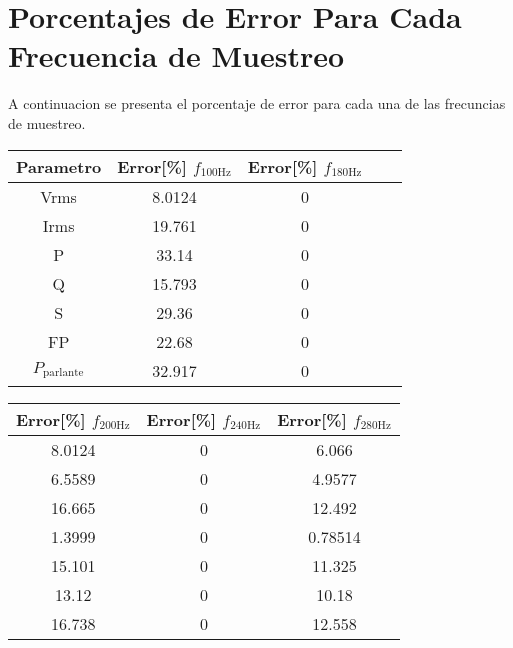 
\section{Porcentajes de Error Para Cada Frecuencia de Muestreo}
A continuacion se presenta el porcentaje de error para cada una de las frecuncias de muestreo.

    \begin{tabular}{ccccc}
        \toprule
        \textbf{Parametro} & \textbf{Error[\%] $f_{\text{100Hz}}$} & \textbf{Error[\%] $f_{\text{180Hz}}$}\\
        \midrule
        Vrms                  & 8.0124   & 0  \\                     
        Irms                  & 19.761  & 0  \\
        P                     & 33.14      & 0  \\
        Q                     & 15.793 & 0 \\
        S                     & 29.36  & 0 \\
        FP                    & 22.68  & 0 \\
        $P_{\text{parlante}}$ & 32.917      & 0  \\
        \bottomrule
        \end{tabular}

    \begin{tabular}{ccc}
        \toprule
        \textbf{Error[\%] $f_{\text{200Hz}}$} & \textbf{Error[\%] $f_{\text{240Hz}}$} & \textbf{Error[\%] $f_{\text{280Hz}}$} \\
        \midrule
        8.0124 & 0 & 6.066 \\ 
        6.5589 & 0 & 4.9577 \\
        16.665 & 0 & 12.492 \\
        1.3999 & 0 & 0.78514 \\
         15.101 & 0 & 11.325 \\
         13.12 & 0 & 10.18 \\
         16.738 & 0 & 12.558   \\
        \bottomrule
        \end{tabular}
